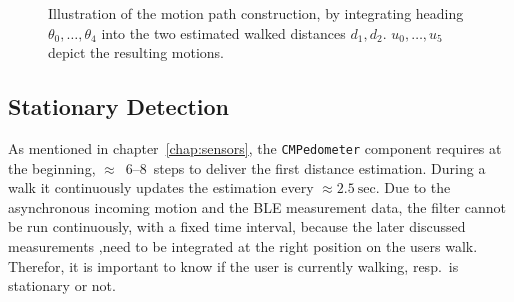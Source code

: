 \begin{figure}
\caption{Illustration of the motion path construction, by integrating heading $\theta_0, \ldots, \theta_4$ into the two estimated walked distances $d_1, d_2$. $u_0, \ldots, u_5$ depict the resulting motions.}
\label{fig:mm_path}
\end{figure}


\subsection{Stationary Detection}\label{sec:algo_stationary}
As mentioned in chapter~\ref{chap:sensors}, the \texttt{CMPedometer} component requires at the beginning, $\approx$~6--8~steps to deliver the first distance estimation. During a walk it continuously updates the estimation every $\approx 2.5~\text{sec}$. Due to the asynchronous incoming motion and the \acs{BLE} measurement data, the filter cannot be run continuously, with a fixed time interval, because the later discussed measurements ,need to be integrated at the right position on the users walk. Therefor, it is important to know if the user is currently walking, resp.\ is stationary or not.

